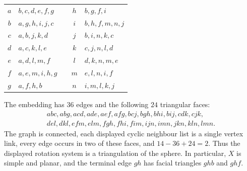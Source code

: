 \documentclass[11pt]{article}
\theoremstyle{definition}
\theoremstyle{remark}
\begin{document}
\begin{center}
\begin{tabular}{c@{\quad}l c@{\qquad}c@{\quad}l}
\toprule
$a$ & $b,c,d,e,f,g$ && $h$ & $b,g,f,i$\\
$b$ & $a,g,h,i,j,c$ && $i$ & $b,h,f,m,n,j$\\
$c$ & $a,b,j,k,d$ && $j$ & $b,i,n,k,c$\\
$d$ & $a,c,k,l,e$ && $k$ & $c,j,n,l,d$\\
$e$ & $a,d,l,m,f$ && $l$ & $d,k,n,m,e$\\
$f$ & $a,e,m,i,h,g$ && $m$ & $e,l,n,i,f$\\
$g$ & $a,f,h,b$ && $n$ & $i,m,l,k,j$\\
\bottomrule
\end{tabular}
\end{center}

The embedding has $36$ edges and the following $24$ triangular faces:
\[
\begin{gathered}
abc,abg,acd,ade,aef,afg,bcj,bgh,bhi,bij,cdk,cjk,\\
del,dkl,efm,elm,fgh,fhi,fim,ijn,imn,jkn,kln,lmn.
\end{gathered}
\]
The graph is connected, each displayed cyclic neighbour list is a single
vertex link, every edge occurs in two of these faces, and
$14-36+24=2$.  Thus the displayed rotation system is a triangulation of the
sphere.  In particular, $X$ is simple and planar, and the terminal edge
$gh$ has facial triangles $ghb$ and $ghf$.
\end{document}
